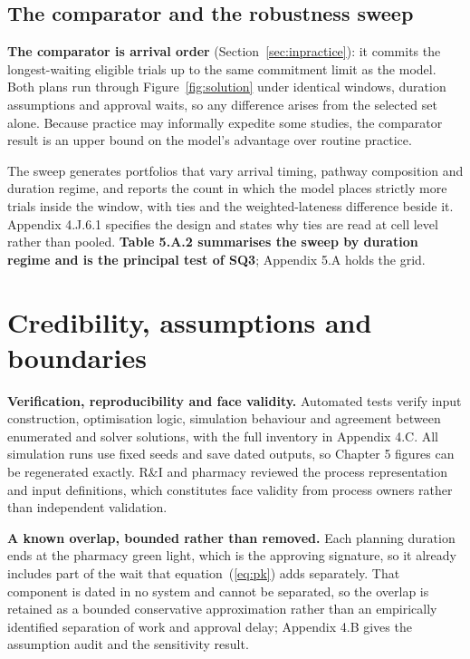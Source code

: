 \subsection{The comparator and the robustness sweep}
\label{sec:comparison}

\textbf{The comparator is arrival order} (Section~\ref{sec:inpractice}): it commits the longest-waiting eligible trials up to the same commitment limit as the model. Both plans run through Figure~\ref{fig:solution} under identical windows, duration assumptions and approval waits, so any difference arises from the selected set alone. Because practice may informally expedite some studies, the comparator result is an upper bound on the model's advantage over routine practice.

The sweep generates portfolios that vary arrival timing, pathway composition and duration regime, and reports the count in which the model places strictly more trials inside the window, with ties and the weighted-lateness difference beside it. Appendix 4.J.6.1 specifies the design and states why ties are read at cell level rather than pooled. \textbf{Table 5.A.2 summarises the sweep by duration regime and is the principal test of SQ3}; Appendix 5.A holds the grid.

\section{Credibility, assumptions and boundaries}
\label{sec:verification}

\textbf{Verification, reproducibility and face validity.} Automated tests verify input construction, optimisation logic, simulation behaviour and agreement between enumerated and solver solutions, with the full inventory in Appendix 4.C. All simulation runs use fixed seeds and save dated outputs, so Chapter 5 figures can be regenerated exactly. R\&I and pharmacy reviewed the process representation and input definitions, which constitutes face validity from process owners rather than independent validation.

\textbf{A known overlap, bounded rather than removed.} Each planning duration ends at the pharmacy green light, which is the approving signature, so it already includes part of the wait that equation~(\ref{eq:pk}) adds separately. That component is dated in no system and cannot be separated, so the overlap is retained as a bounded conservative approximation rather than an empirically identified separation of work and approval delay; Appendix 4.B gives the assumption audit and the sensitivity result.

